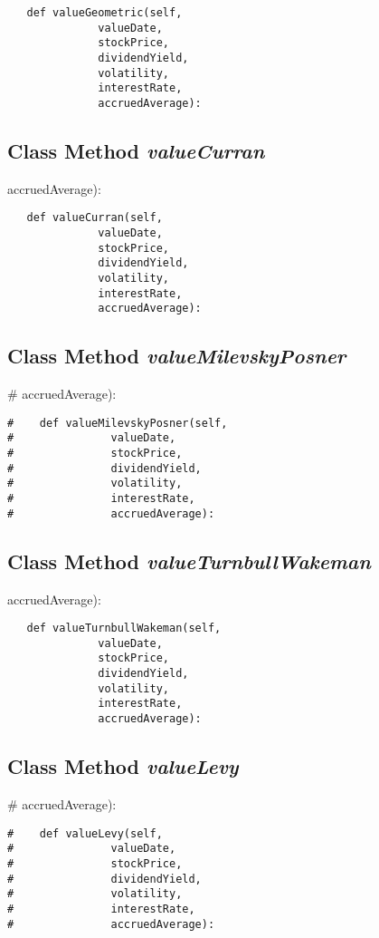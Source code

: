 \documentclass[twoside,11pt]{book}
\begin{document}
\begin{lstlisting}
   def valueGeometric(self,
              valueDate,
              stockPrice,
              dividendYield,
              volatility,
              interestRate,
              accruedAverage):
\end{lstlisting}

\subsection{Class Method {\it valueCurran}}
accruedAverage):

\begin{lstlisting}
   def valueCurran(self,
              valueDate,
              stockPrice,
              dividendYield,
              volatility,
              interestRate,
              accruedAverage):
\end{lstlisting}

\subsection{Class Method {\it valueMilevskyPosner}}
\#               accruedAverage):

\begin{lstlisting}
#    def valueMilevskyPosner(self,
#               valueDate,
#               stockPrice,
#               dividendYield,
#               volatility,
#               interestRate,
#               accruedAverage):
\end{lstlisting}

\subsection{Class Method {\it valueTurnbullWakeman}}
accruedAverage):

\begin{lstlisting}
   def valueTurnbullWakeman(self,
              valueDate,
              stockPrice,
              dividendYield,
              volatility,
              interestRate,
              accruedAverage):
\end{lstlisting}

\subsection{Class Method {\it valueLevy}}
\#               accruedAverage):

\begin{lstlisting}
#    def valueLevy(self,
#               valueDate,
#               stockPrice,
#               dividendYield,
#               volatility,
#               interestRate,
#               accruedAverage):
\end{lstlisting}
\end{document}
